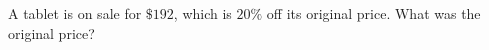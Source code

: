 A tablet is on sale for $\$192$, which is $20\%$ off its original price. What was the original price?
